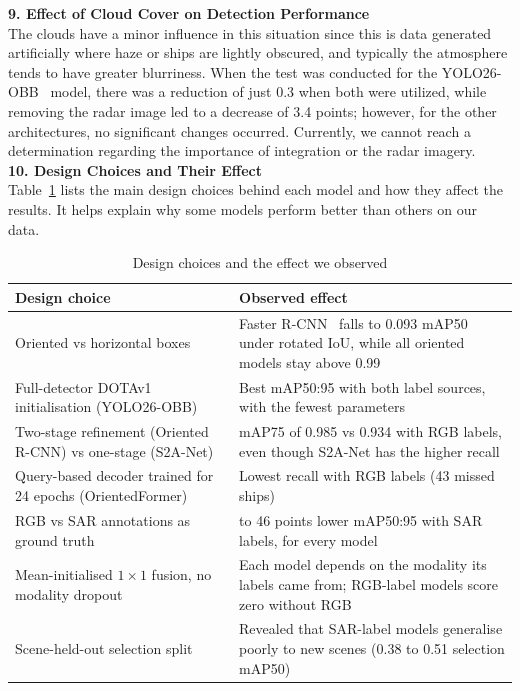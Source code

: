 \noindent\textbf{9. Effect of Cloud Cover on Detection Performance}\\
The clouds have a minor influence in this situation since this is data generated artificially where haze or ships are lightly obscured, and typically the atmosphere tends to have greater blurriness. When the test was conducted for the YOLO26-OBB~\cite{jocher2026ultralytics} model, there was a reduction of just 0.3 when both were utilized, while removing the radar image led to a decrease of 3.4 points; however, for the other architectures, no significant changes occurred. Currently, we cannot reach a determination regarding the importance of integration or the radar imagery.\\

\noindent\textbf{10. Design Choices and Their Effect}\\
Table~\ref{tab:design_choices} lists the main design choices behind each model and how they affect the results. It helps explain why some models perform better than others on our data.

\begin{table}[htbp]
\centering

\begin{tabular}{|>{\raggedright\arraybackslash}p{5.2cm}|>{\raggedright\arraybackslash}p{8.8cm}|}
\hline
\textbf{Design choice} & \textbf{Observed effect} \\
\hline
Oriented vs horizontal boxes & Faster R-CNN~\cite{7485869} falls to 0.093 mAP50 under rotated IoU, while all oriented models stay above 0.99 \\
\hline
Full-detector DOTAv1 initialisation (YOLO26-OBB) & Best mAP50:95 with both label sources, with the fewest parameters \\
\hline
Two-stage refinement (Oriented R-CNN) vs one-stage (S2A-Net) & mAP75 of 0.985 vs 0.934 with RGB labels, even though S2A-Net has the higher recall \\
\hline
Query-based decoder trained for 24 epochs (OrientedFormer) & Lowest recall with RGB labels (43 missed ships) \\
\hline
RGB vs SAR annotations as ground truth & 29 to 46 points lower mAP50:95 with SAR labels, for every model \\
\hline
Mean-initialised $1\times1$ fusion, no modality dropout & Each model depends on the modality its labels came from; RGB-label models score zero without RGB \\
\hline
Scene-held-out selection split & Revealed that SAR-label models generalise poorly to new scenes (0.38 to 0.51 selection mAP50) \\
\hline
\end{tabular}
\caption{Design choices and the effect we observed}
\label{tab:design_choices}
\end{table}

